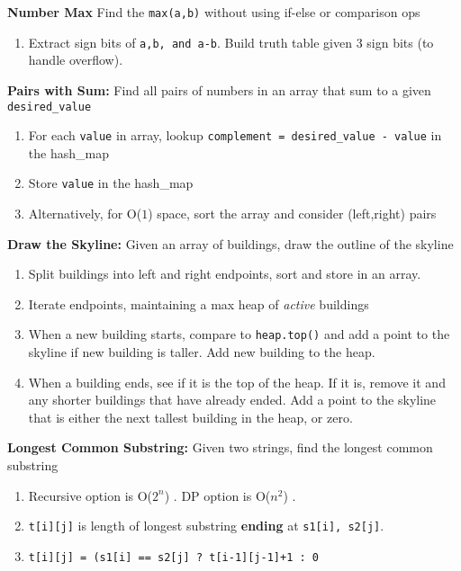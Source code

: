 \documentclass[12pt]{article}
\newcommand{\OONE}{O($1$) }
\newcommand{\ONSQ}{O($n^2$) }
\newcommand{\OTWON}{O($2^n$) }
\begin{document}
\vspace{5mm}
\noindent
\textbf{Number Max}
Find the \texttt{max(a,b)} without using if-else or comparison ops
\begin{enumerate}
\item Extract sign bits of \texttt{a,b, and a-b}. Build truth table given 3 sign bits (to handle overflow).
\end{enumerate}


\vspace{5mm}
\noindent
\textbf{Pairs with Sum:}
Find all pairs of numbers in an array that sum to a given \texttt{desired\_value}
\begin{enumerate}
\item For each \texttt{value} in array, lookup \texttt{complement = desired\_value - value} in the hash\_map
\item Store \texttt{value} in the hash\_map
\item Alternatively, for \OONE space, sort the array and consider (left,right) pairs
\end{enumerate}


\vspace{5mm}
\noindent
\textbf{Draw the Skyline:}
Given an array of buildings, draw the outline of the skyline
\begin{enumerate}
\item Split buildings into left and right endpoints, sort and store in an array.
\item Iterate endpoints, maintaining a max heap of \emph{active} buildings
\item When a new building starts, compare to \texttt{heap.top()} and add a point to the skyline if new building is taller. Add new building to the heap.
\item When a building ends, see if it is the top of the heap. If it is, remove it and any shorter buildings that have already ended. Add a point to the skyline that is either the next tallest building in the heap, or zero.
\end{enumerate}


\vspace{5mm}
\noindent
\textbf{Longest Common Substring:}
Given two strings, find the longest common substring
\begin{enumerate}
\item Recursive option is \OTWON. DP option is \ONSQ.
\item \texttt{t[i][j]} is length of longest substring \textbf{ending} at \texttt{s1[i], s2[j]}.
\item \texttt{t[i][j] = (s1[i] == s2[j] ? t[i-1][j-1]+1 : 0}
\end{enumerate}
\end{document}
